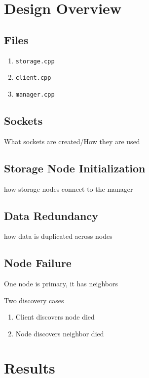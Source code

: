 \documentclass{article}
\begin{document}
\section{Design Overview}
\subsection{Files}
\begin{enumerate}
    \item \texttt{storage.cpp}
    \item \texttt{client.cpp}
    \item \texttt{manager.cpp}
\end{enumerate}

\subsection{Sockets}
What sockets are created/How they are used
\subsection{Storage Node Initialization}
how storage nodes connect to the manager
\subsection{Data Redundancy}
how data is duplicated across nodes
\subsection{Node Failure}
One node is primary, it has neighbors

Two discovery cases
\begin{enumerate}
    \item Client discovers node died
    \item Node discovers neighbor died
\end{enumerate}

\section{Results}
\end{document}
